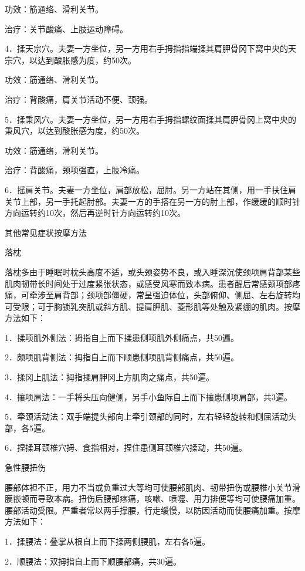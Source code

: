 \documentclass[12pt,UTF8,openany]{ctexbook}
\begin{document}
功效：筋通络、滑利关节。

治疗：关节酸痛、上肢运动障碍。

4．揉天宗穴。夫妻一方坐位，另一方用右手拇指指端揉其肩胛骨冈下窝中央的天宗穴，以达到酸胀感为度，约50次。

功效：筋通络、滑利关节。

治疗：背酸痛，肩关节活动不便、颈强。

5．揉秉风穴。夫妻一方坐位，另一方用右手拇指螺纹面揉其肩胛骨冈上窝中央的秉风穴，以达到酸胀感为度，约50次。

功效：筋通络，滑利关节。

治疗：背酸痛，颈项强直，上肢冷痛。

6．摇肩关节。夫妻一方坐位，肩部放松，屈肘。另一方站在其侧，用一手扶住肩关节上部，另一手托起肘部。夫妻一方的手搭在另一方的肘上部，作缓缓的顺时针方向运转约10次，然后再逆时针方向运转约10次。





其他常见症状按摩方法


落枕

落枕多由于睡眠时枕头高度不适，或头颈姿势不良，或入睡深沉使颈项肩背部某些肌肉韧带长时间处于过度紧张状态，或感受风寒而致本病。患者醒后常感颈项部疼痛，可牵涉至肩背部；颈项部僵硬，常呈强迫体位，头部俯仰、侧屈、左右旋转均可受限；可于胸锁乳突肌或斜方肌、提肩胛肌、菱形肌等处触及紧绷的肌肉。按摩方法如下：

1．揉项肌外侧法：拇指自上而下揉患侧项肌外侧痛点，共50遍。

2．颇项肌背侧法：拇指自上而下顺患侧项肌背侧痛点，共50遍。

3．揉冈上肌法：拇指揉肩胛冈上方肌肉之痛点，共50遍。

4．攘项肩法：一手将头压向健侧，另手小鱼际自上而下攘患侧项肩部，共3遍。

5．牵颈活动法：双手端提头部向上牵引颈部的同时，左右轻轻旋转和侧屈活动头部，各5遍。

6．捏揉耳颈椎穴拇、食指相对，捏住患侧耳颈椎穴揉动，共50遍。

急性腰扭伤

腰部体袒不正，用力不当或负重过大等均可使腰部肌肉、韧带扭伤或腰椎小关节滑膜嵌顿而导致本病。扭伤后腰部疼痛，咳嗽、喷嚏、用力排便等均可使腰痛加重。腰部活动受限。严重者常以两手撑腰，行走缓慢，以防因活动而使腰痛加重。按摩方法如下：

1．揉腰法：叠掌从根自上而下揉两侧腰肌，左右各5遍。

2．顺腰法：双拇指自上而下顺腰部痛，共30遍。
\end{document}
